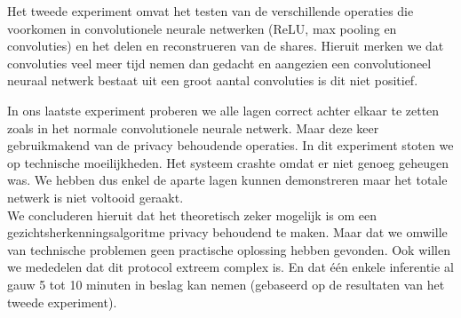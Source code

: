Het tweede experiment omvat het testen van de verschillende operaties die voorkomen in convolutionele neurale netwerken (ReLU, max pooling en convoluties) en het delen en reconstrueren van de shares. Hieruit merken we dat convoluties veel meer tijd nemen dan gedacht en aangezien een convolutioneel neuraal netwerk bestaat uit een groot aantal convoluties is dit niet positief.

In ons laatste experiment proberen we alle lagen correct achter elkaar te zetten zoals in het normale convolutionele neurale netwerk. Maar deze keer gebruikmakend van de privacy behoudende operaties. In dit experiment stoten we op technische moeilijkheden. Het systeem crashte omdat er niet genoeg geheugen was. We hebben dus enkel de aparte lagen kunnen demonstreren maar het totale netwerk is niet voltooid geraakt.\\

We concluderen hieruit dat het theoretisch zeker mogelijk is om een gezichtsherkenningsalgoritme privacy behoudend te maken. Maar dat we omwille van technische problemen geen practische oplossing hebben gevonden. Ook willen we mededelen dat dit protocol extreem complex is. En dat \'e\'en enkele inferentie al gauw 5 tot 10 minuten in beslag kan nemen (gebaseerd op de resultaten van het tweede experiment).
